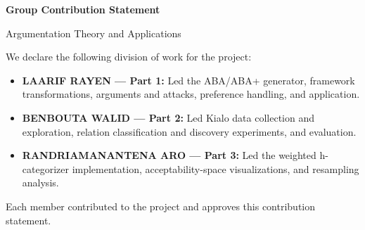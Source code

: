 \documentclass[11pt,a4paper]{article}
\begin{document}
\begin{center}
{\LARGE\bfseries Group Contribution Statement\par}
\vspace{0.8em}
Argumentation Theory and Applications
\end{center}

\vspace{1em}

We declare the following division of work for the project:

\begin{itemize}
   \item \textbf{LAARIF RAYEN --- Part 1:} Led the ABA/ABA+ generator, framework transformations, arguments and attacks, preference handling, and application.
  \item \textbf{BENBOUTA WALID --- Part 2:} Led Kialo data collection and exploration, relation classification and discovery experiments, and evaluation.
  \item \textbf{RANDRIAMANANTENA ARO --- Part 3:} Led the weighted h-categorizer implementation, acceptability-space visualizations, and resampling analysis.
\end{itemize}

Each member contributed to the project and approves this contribution statement.

\vspace{1.5em}
\end{document}
